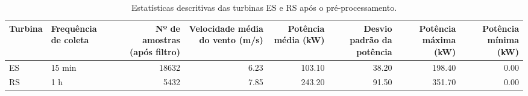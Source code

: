 \begin{table}
\centering
\caption{Estatísticas descritivas das turbinas ES e RS após o pré-processamento.}
\label{tab:estatisticas_turbinas}
\begin{tabular}{llrrrrrr}
\toprule
Turbina & Frequência de coleta &  Nº de amostras (após filtro) &  Velocidade média do vento (m/s) &  Potência média (kW) &  Desvio padrão da potência &  Potência máxima (kW) &  Potência mínima (kW) \\
\midrule
     ES &               15 min &                         18632 &                             6.23 &               103.10 &                      38.20 &                198.40 &                  0.00 \\
     RS &                  1 h &                          5432 &                             7.85 &               243.20 &                      91.50 &                351.70 &                  0.00 \\
\bottomrule
\end{tabular}
\end{table}
